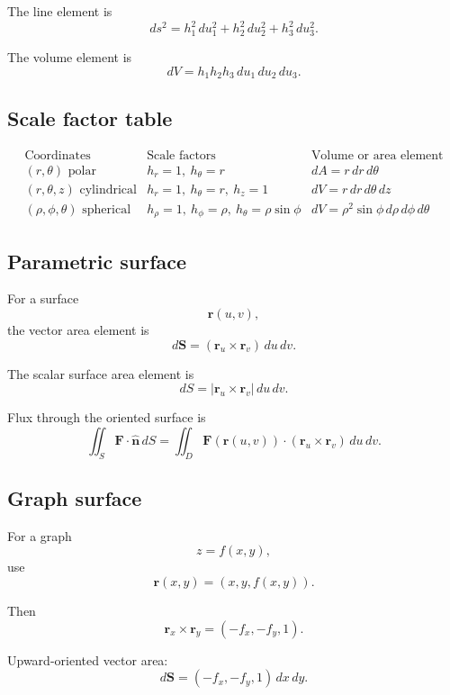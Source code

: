 The line element is
\[
\boxed{
    ds^2=h_1^2\,du_1^2+h_2^2\,du_2^2+h_3^2\,du_3^2.
}
\]

The volume element is
\[
\boxed{
    dV=h_1h_2h_3\,du_1\,du_2\,du_3.
}
\]

\subsection*{Scale factor table}

\[
\begin{array}{c|c|c}
\text{Coordinates} & \text{Scale factors} & \text{Volume or area element} \\ \hline
(r,\theta)\text{ polar} &
h_r=1,\ h_\theta=r &
dA=r\,dr\,d\theta\\[2mm]

(r,\theta,z)\text{ cylindrical} &
h_r=1,\ h_\theta=r,\ h_z=1 &
dV=r\,dr\,d\theta\,dz\\[2mm]

(\rho,\phi,\theta)\text{ spherical} &
h_\rho=1,\ h_\phi=\rho,\ h_\theta=\rho\sin\phi &
dV=\rho^2\sin\phi\,d\rho\,d\phi\,d\theta
\end{array}
\]

\subsection*{Parametric surface}

For a surface
\[
    \mathbf r(u,v),
\]
the vector area element is
\[
\boxed{
    d\mathbf S
    =
    (\mathbf r_u\times\mathbf r_v)\,du\,dv.
}
\]

The scalar surface area element is
\[
\boxed{
    dS=
    |\mathbf r_u\times\mathbf r_v|\,du\,dv.
}
\]

Flux through the oriented surface is
\[
\boxed{
    \iint_S \mathbf F\cdot\widehat{\mathbf n}\,dS
    =
    \iint_D
    \mathbf F(\mathbf r(u,v))
    \cdot
    (\mathbf r_u\times\mathbf r_v)
    \,du\,dv.
}
\]

\subsection*{Graph surface}

For a graph
\[
    z=f(x,y),
\]
use
\[
    \mathbf r(x,y)=(x,y,f(x,y)).
\]

Then
\[
\boxed{
    \mathbf r_x\times\mathbf r_y
    =
    (-f_x,-f_y,1).
}
\]

Upward-oriented vector area:
\[
\boxed{
    d\mathbf S=(-f_x,-f_y,1)\,dx\,dy.
}
\]


